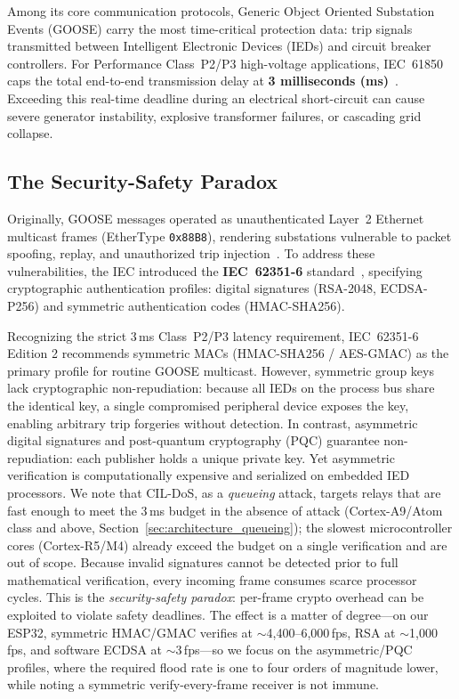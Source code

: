 \documentclass[journal]{IEEEtran}
\begin{document}
Among its core communication protocols, Generic Object Oriented Substation Events (GOOSE) carry the most time-critical protection data: trip signals transmitted between Intelligent Electronic Devices (IEDs) and circuit breaker controllers. For Performance Class~P2/P3 high-voltage applications, IEC~61850 caps the total end-to-end transmission delay at \textbf{3 milliseconds (ms)}~\cite{iec61850}. Exceeding this real-time deadline during an electrical short-circuit can cause severe generator instability, explosive transformer failures, or cascading grid collapse.

\subsection{The Security-Safety Paradox}
Originally, GOOSE messages operated as unauthenticated Layer~2 Ethernet multicast frames (EtherType \texttt{0x88B8}), rendering substations vulnerable to packet spoofing, replay, and unauthorized trip injection~\cite{schuster2017goose, hong2014cyber}. To address these vulnerabilities, the IEC introduced the \textbf{IEC~62351-6} standard~\cite{iec62351}, specifying cryptographic authentication profiles: digital signatures (RSA-2048, ECDSA-P256) and symmetric authentication codes (HMAC-SHA256).

Recognizing the strict 3\,ms Class~P2/P3 latency requirement, IEC~62351-6 Edition 2 recommends symmetric MACs (HMAC-SHA256 / AES-GMAC) as the primary profile for routine GOOSE multicast. However, symmetric group keys lack cryptographic non-repudiation: because all IEDs on the process bus share the identical key, a single compromised peripheral device exposes the key, enabling arbitrary trip forgeries without detection. In contrast, asymmetric digital signatures and post-quantum cryptography (PQC) guarantee non-repudiation: each publisher holds a unique private key. Yet asymmetric verification is computationally expensive and serialized on embedded IED processors. We note that CIL-DoS, as a \emph{queueing} attack, targets relays that are fast enough to meet the 3\,ms budget in the absence of attack (Cortex-A9/Atom class and above, Section~\ref{sec:architecture_queueing}); the slowest microcontroller cores (Cortex-R5/M4) already exceed the budget on a single verification and are out of scope. Because invalid signatures cannot be detected prior to full mathematical verification, every incoming frame consumes scarce processor cycles. This is the \emph{security-safety paradox}: per-frame crypto overhead can be exploited to violate safety deadlines. The effect is a matter of degree---on our ESP32, symmetric HMAC/GMAC verifies at $\sim$4{,}400--6{,}000\,fps, RSA at $\sim$1{,}000\,fps, and software ECDSA at $\sim$3\,fps---so we focus on the asymmetric/PQC profiles, where the required flood rate is one to four orders of magnitude lower, while noting a symmetric verify-every-frame receiver is not immune.
\end{document}
